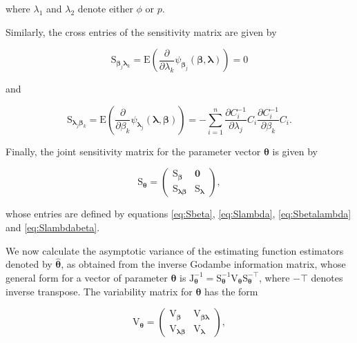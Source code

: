 \documentclass[9pt,a5paper,]{book}
\theoremstyle{definition}
\theoremstyle{definition}
\theoremstyle{remark}
\begin{document}
where \(\lambda_1\) and \(\lambda_2\) denote either \(\phi\) or \(p\).

Similarly, the cross entries of the sensitivity matrix are given by

\begin{equation}
\mathrm{S}_{\boldsymbol{\beta}_j \boldsymbol{\lambda}_k} = \mathrm{E}\left ( \frac{\partial}{\partial \lambda_k}\psi_{\boldsymbol{\beta}_j}(\boldsymbol{\beta}, \boldsymbol{\lambda})  \right ) = 0
\label{eq:Sbetalambda}
\end{equation}

and

\begin{equation}
\mathrm{S}_{\boldsymbol{\lambda}_j \boldsymbol{\beta}_k} = \mathrm{E}\left ( \frac{\partial}{\partial \beta_k}\psi_{\boldsymbol{\lambda}_j}(\boldsymbol{\lambda}, \boldsymbol{\beta})  \right ) = -\sum_{i=1}^n \frac{\partial C_i^{-1}}{\partial \lambda_j} C_i \frac{\partial C_i^{-1}}{\partial \beta_k} C_i.
\label{eq:Slambdabeta}
\end{equation}

Finally, the joint sensitivity matrix for the parameter vector
\(\boldsymbol{\theta}\) is given by

\begin{equation*}
\mathrm{S}_{\boldsymbol{\theta}} = \begin{pmatrix}
\mathrm{S}_{\boldsymbol{\beta}} & \boldsymbol{0} \\ 
\mathrm{S}_{\boldsymbol{\lambda}\boldsymbol{\beta}} & \mathrm{S}_{\boldsymbol{\lambda}}
\end{pmatrix},
\end{equation*}

whose entries are defined by equations \eqref{eq:Sbeta}, \eqref{eq:Slambda},
\eqref{eq:Sbetalambda} and \eqref{eq:Slambdabeta}.

We now calculate the asymptotic variance of the estimating function
estimators denoted by \(\boldsymbol{\hat{\theta}}\), as obtained from
the inverse Godambe information matrix, whose general form for a vector
of parameter \(\boldsymbol{\theta}\) is
\(\mathrm{J}^{-1}_{\boldsymbol{\theta}} = \mathrm{S}^{-1}_{\boldsymbol{\theta}} \mathrm{V}_{\boldsymbol{\theta}} \mathrm{S}^{-\top}_{\boldsymbol{\theta}}\),
where \(-\top\) denotes inverse transpose. The variability matrix for
\(\boldsymbol{\theta}\) has the form

\begin{equation}
\mathrm{V}_{\boldsymbol{\theta}} = \begin{pmatrix}
\mathrm{V}_{\boldsymbol{\beta}} & \mathrm{V}_{\boldsymbol{\beta}\boldsymbol{\lambda}} \\ 
\mathrm{V}_{\boldsymbol{\lambda}\boldsymbol{\beta}} & \mathrm{V}_{\boldsymbol{\lambda}}
\end{pmatrix},
\label{eq:VTHETA}
\end{equation}
\end{document}
